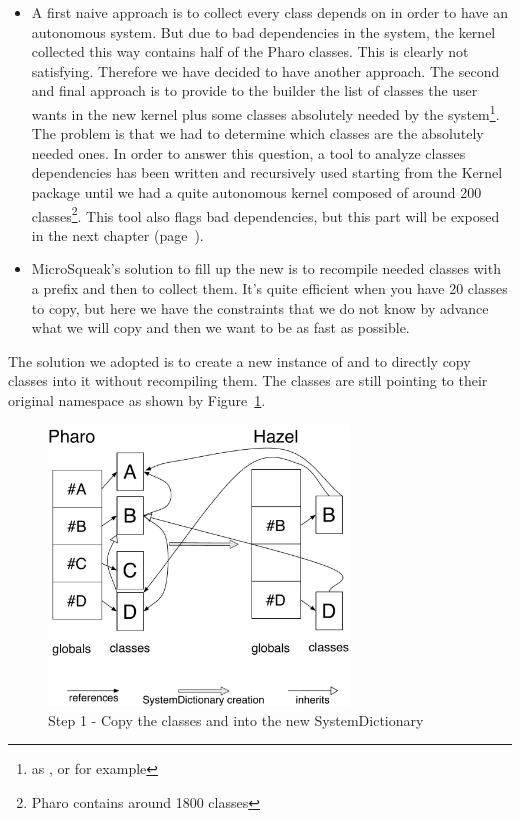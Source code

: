 \solutions
\begin{itemize}
	\item A first naive approach is to collect every class  depends on in order to have an autonomous system. But due to bad dependencies in the system, the kernel collected this way contains half of the \gls{Pharo} classes. This is clearly not satisfying. Therefore we have decided to have another approach. The second and final approach is to provide to the builder the list of classes the user wants in the new kernel plus some classes absolutely needed by the system\footnote{as ,  or  for example}. The problem is that we had to determine which classes are the absolutely needed ones. In order to answer this question, a tool to analyze classes dependencies has been written and recursively used starting from the Kernel package until we had a quite autonomous kernel composed of around 200 classes\footnote{\gls{Pharo} contains around 1800 classes}. This tool also flags bad dependencies, but this part will be exposed in the next chapter (page~\pageref{KernelIsolation}). 


	\item MicroSqueak's solution to fill up the new  is to recompile needed classes with a prefix and then to collect them. It's quite efficient when you have 20 classes to copy, but here we have the constraints that we do not know by advance what we will copy and then we want to be as fast as possible. 
\end{itemize}	
	
The solution we adopted is to create a new instance of  and to directly copy classes into it without recompiling them. The classes are still pointing to their original namespace as shown by Figure~\ref{ClassesCopy}.
	
\begin{figure}[h]
	\centering\includegraphics[width = 8cm]{figures/CopyWithInh}
	\caption{Step 1 - Copy the classes  and  into the new SystemDictionary}
	\label{ClassesCopy}
\end{figure}
	
